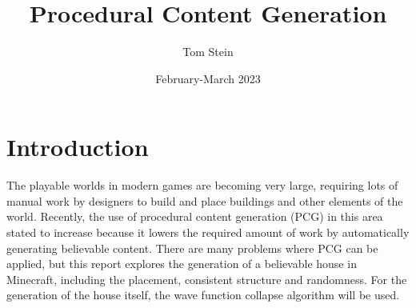 \documentclass[
oneside,
fontsize=11pt
]{scrartcl}
\title{Procedural Content Generation}
\author{Tom Stein}
\date{February-March 2023}
\begin{document}


%






\newpage

 




\section{Introduction}
The playable worlds in modern games are becoming very large, 
requiring lots of manual work by designers 
to build and place buildings and other elements of the world. 
Recently, the use of procedural content generation (PCG) in this area 
stated to increase because it lowers the required amount of work 
by automatically generating believable content. 
There are many problems where PCG can be applied,
but this report explores the generation of a believable house in Minecraft,
including the placement, consistent structure and randomness. 
For the generation of the house itself, 
the wave function collapse algorithm will be used.
\end{document}
